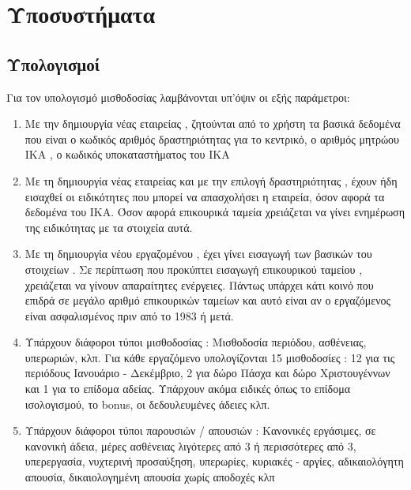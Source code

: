 \documentclass[A4,10pt,greek]{book}
\begin{document}
\section{Υποσυστήματα}
\subsection{Υπολογισμοί}
Για τον υπολογισμό μισθοδοσίας λαμβάνονται υπ'όψιν οι εξής παράμετροι:
\begin{enumerate}
\item Με την δημιουργία νέας εταιρείας , ζητούνται από το χρήστη τα βασικά δεδομένα που είναι ο κωδικός αριθμός δραστηριότητας για το κεντρικό, ο αριθμός μητρώου ΙΚΑ , ο κωδικός υποκαταστήματος του ΙΚΑ
\item Με τη δημιουργία νέας εταιρείας και με την επιλογή δραστηριότητας , έχουν ήδη εισαχθεί οι ειδικότητες που μπορεί να απασχολήσει η εταιρεία, όσον αφορά τα δεδομένα του ΙΚΑ. Όσον αφορά επικουρικά ταμεία χρειάζεται να γίνει ενημέρωση της ειδικότητας με τα στοιχεία αυτά.
\item Με τη δημιουργία νέου εργαζομένου , έχει γίνει εισαγωγή των βασικών του στοιχείων . Σε περίπτωση που προκύπτει εισαγωγή επικουρικού ταμείου , χρειάζεται να γίνουν απαραίτητες ενέργειες. Πάντως υπάρχει κάτι κοινό που επιδρά σε μεγάλο αριθμό επικουρικών ταμείων και αυτό είναι αν ο εργαζόμενος είναι ασφαλισμένος πριν από το 1983 ή μετά.
\item Υπάρχουν διάφοροι τύποι μισθοδοσίας : Μισθοδοσία περιόδου, ασθένειας, υπερωριών, κλπ. Για κάθε εργαζόμενο υπολογίζονται 15 μισθοδοσίες : 12 για τις περιόδους Ιανουάριο - Δεκέμβριο, 2 για δώρο Πάσχα και δώρο Χριστουγέννων και 1 για το επίδομα αδείας. Υπάρχουν ακόμα ειδικές όπως το επίδομα ισολογισμού, το bonus, οι δεδουλευμένες άδειες κλπ.
\item Υπάρχουν διάφοροι τύποι παρουσιών / απουσιών : Κανονικές εργάσιμες, σε κανονική άδεια, μέρες ασθένειας λιγότερες από 3 ή περισσότερες από 3, υπερεργασία, νυχτερινή προσαύξηση, υπερωρίες, κυριακές - αργίες, αδικαιολόγητη απουσία, δικαιολογημένη απουσία χωρίς αποδοχές κλπ
\end{enumerate}
\end{document}
